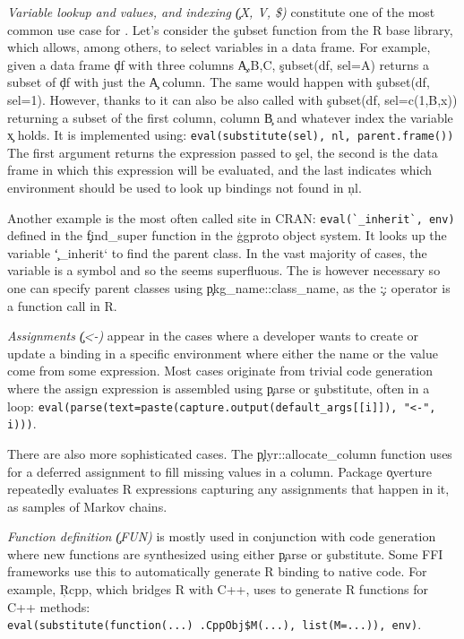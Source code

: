 \documentclass[review,screen,acmsmall,anonymous=true]{acmart}
\begin{document}
\begin{compactitem}[---]

  \item \emph{Variable lookup and values, and indexing \c{(X, V, \$)}}
    constitute one of the most common use case for \eval. Let's consider the
    \c{subset} function from the R base library, which allows, among others, to
    select variables in a data frame. For example, given a data frame \c{df}
    with three columns \c{A,B,C}, \c{subset(df, sel=A)} returns a subset of
    \c{df} with just the \c{A} column. The same would happen with \c{subset(df,
    sel=1)}. However, thanks to \eval it can also be also called with
    \c{subset(df, sel=c(1,B,x))} returning a subset of the first column, column
    \c{B} and whatever index the variable \c{x} holds. It is implemented using:
    \lstinline|eval(substitute(sel), nl, parent.frame())| The first argument
    returns the expression passed to \c{sel}, the second is the data frame in
    which this expression will be evaluated, and the last indicates
    which environment should be used to look up bindings not found in \c{nl}.

    Another example is the most often called \eval site in CRAN:
    \lstinline|eval(`_inherit`, env)| defined in the \c{find\_super} function
    in the \c{ggproto} object system. It looks up the variable \c{`\_inherit`} to
    find the parent class. In the vast majority of cases, the variable is a symbol
    and so the \eval seems superfluous. The \eval is however necessary so one
    can specify parent classes using \c{pkg\_name::class\_name}, as the \c{::}
    operator is a function call in R.

  \item \emph{Assignments \c{(<-)}} appear in the cases where a developer wants
    to create or update a binding in a specific environment where either the
    name or the value come from some expression. Most cases originate from trivial
    code generation where the assign expression is assembled using \c{parse} or
    \c{substitute}, often in a loop: \lstinline|eval(parse(text=paste(capture.output(default_args[[i]]), "<-", i)))|.

    There are also more sophisticated cases. The \c{plyr::allocate\_column}
    function uses \eval for a deferred assignment to fill missing values in a
    column. Package \c{overture} repeatedly evaluates R expressions capturing any  assignments that happen in it, as samples of Markov chains.

  \item \emph{Function definition \c{(FUN)}} is mostly used in conjunction with
    code generation where new functions are synthesized using either \c{parse}
    or \c{substitute}. Some FFI frameworks use this to automatically generate R
    binding to native code. For example, \c{Rcpp}, which bridges R with C++,
    uses \eval to generate R functions for C++ methods:\\
    \lstinline|eval(substitute(function(...) .CppObj$M(...), list(M=...)), env)|.


\end{compactitem}
\end{document}
